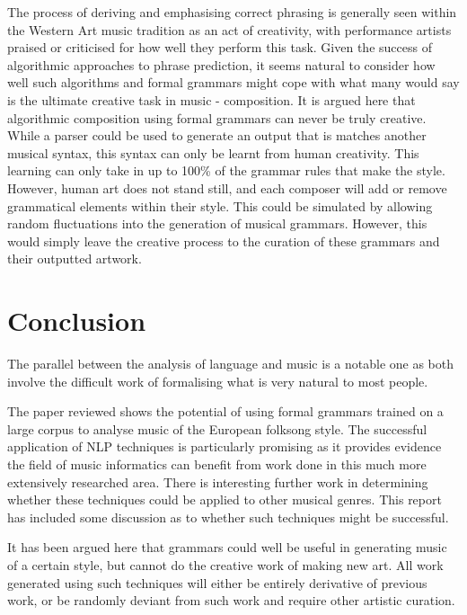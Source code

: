 \documentclass[a4paper,12pt]{article}
\begin{document}
The process of deriving and emphasising correct phrasing is generally seen within the Western Art music tradition as an act of creativity, with performance artists praised or criticised for how well they perform this task. Given the success of algorithmic approaches to phrase prediction, it seems natural to consider how well such algorithms and formal grammars might cope with what many would say is the ultimate creative task in music - composition. It is argued here that algorithmic composition using formal grammars can never be truly creative. While a parser could be used to generate an output that is matches another musical syntax, this syntax can only be learnt from human creativity. This learning can only take in up to 100\% of the grammar rules that make the style. However, human art does not stand still, and each composer will add or remove grammatical elements within their style. This could be simulated by allowing random fluctuations into the generation of musical grammars. However, this would simply leave the creative process to the curation of these grammars and their outputted artwork. 

\section{Conclusion}
The parallel between the analysis of language and music is a notable one as both involve the difficult work of formalising what is very natural to most people. 

The paper reviewed shows the potential of using formal grammars trained on a large corpus to analyse music of the European folksong style. The successful application of NLP techniques is particularly promising as it provides evidence the field of music informatics can benefit from work done in this much more extensively researched area. There is interesting further work in determining whether these techniques could be applied to other musical genres. This report has included some discussion as to whether such techniques might be successful.

It has been argued here that grammars could well be useful in generating music of a certain style, but cannot do the creative work of making new art. All work generated using such techniques will either be entirely derivative of previous work, or be randomly deviant from such work and require other artistic curation.



\end{document}
